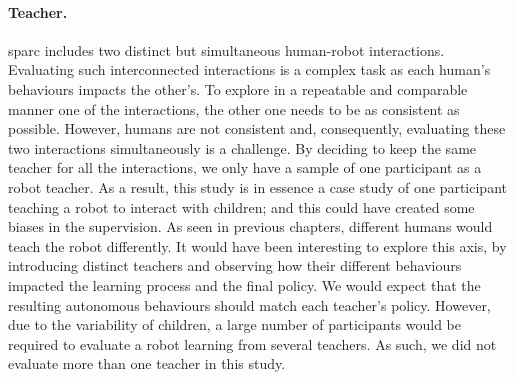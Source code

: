 \paragraph{Teacher.}
\gls{sparc} includes two distinct but simultaneous human-robot interactions. Evaluating such interconnected interactions is a complex task as each human's behaviours impacts the other's. To explore in a repeatable and comparable manner one of the interactions, the other one needs to be as consistent as possible. However, humans are not consistent and, consequently, evaluating these two interactions simultaneously is a challenge. By deciding to keep the same teacher for all the interactions, we only have a sample of one participant as a robot teacher. As a result, this study is in essence a case study of one participant teaching a robot to interact with children; and this could have created some biases in the supervision. As seen in previous chapters, different humans would teach the robot differently. It would have been interesting to explore this axis, by introducing distinct teachers and observing how their different behaviours impacted the learning process and the final policy. We would expect that the resulting autonomous behaviours should match each teacher's policy. However, due to the variability of children, a large number of participants would be required to evaluate a robot learning from several teachers. As such, we did not evaluate more than one teacher in this study.
%


